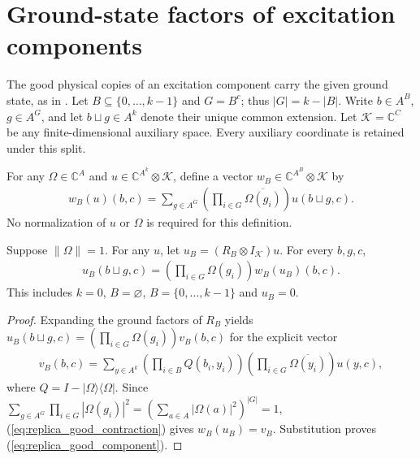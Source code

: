 \section{Ground-state factors of excitation components}
\label{sec:replica_good_copy}

The good physical copies of an excitation component carry the given ground
state, as in \cite[Section~7]{OpenAI2026AreaLaw}. Let
$B\subseteq\{0,\ldots,k-1\}$ and $G=B^c$; thus $|G|=k-|B|$.
Write $b\in A^B$, $g\in A^G$, and let $b\sqcup g\in A^k$ denote their
unique common extension. Let $\mathcal K=\mathbb C^C$ be any
finite-dimensional auxiliary space. Every auxiliary coordinate is retained
under this split.

\begin{definition}
\label{def:replica_good_remainder}
\leanok
For any $\Omega\in\mathbb C^A$ and $u\in\mathbb C^{A^k}\otimes\mathcal K$,
define a vector $w_B\in\mathbb C^{A^B}\otimes\mathcal K$ by
\begin{align}
 w_B(u)(b,c)=\sum_{g\in A^G}
   \left(\prod_{i\in G}\overline{\Omega(g_i)}\right)u(b\sqcup g,c).
 \label{eq:replica_good_contraction}
\end{align}
No normalization of $u$ or $\Omega$ is required for this definition.
\end{definition}

\begin{theorem}
\label{thm:replica_good_component}
\leanok
{}
Suppose $\|\Omega\|=1$. For any $u$, let
$u_B=(R_B\otimes I_{\mathcal K})u$. For every $b,g,c$,
\begin{align}
 u_B(b\sqcup g,c)=\left(\prod_{i\in G}\Omega(g_i)\right)w_B(u_B)(b,c).
 \label{eq:replica_good_component}
\end{align}
This includes $k=0$, $B=\varnothing$, $B=\{0,\ldots,k-1\}$ and $u_B=0$.
\end{theorem}
\begin{proof}
\leanok
Expanding the ground factors of $R_B$ yields
$u_B(b\sqcup g,c)=(\prod_{i\in G}\Omega(g_i))v_B(b,c)$ for the explicit vector
\begin{align}
 v_B(b,c)=\sum_{y\in A^k}
 \left(\prod_{i\in B}Q(b_i,y_i)\right)
 \left(\prod_{i\in G}\overline{\Omega(y_i)}\right)u(y,c),
 \label{eq:replica_good_residual}
\end{align}
where $Q=I-|\Omega\rangle\langle\Omega|$. Since
$\sum_{g\in A^G}\prod_{i\in G}|\Omega(g_i)|^2
=(\sum_{a\in A}|\Omega(a)|^2)^{|G|}=1$,
(\ref{eq:replica_good_contraction}) gives $w_B(u_B)=v_B$.
Substitution proves (\ref{eq:replica_good_component}).
\end{proof}

